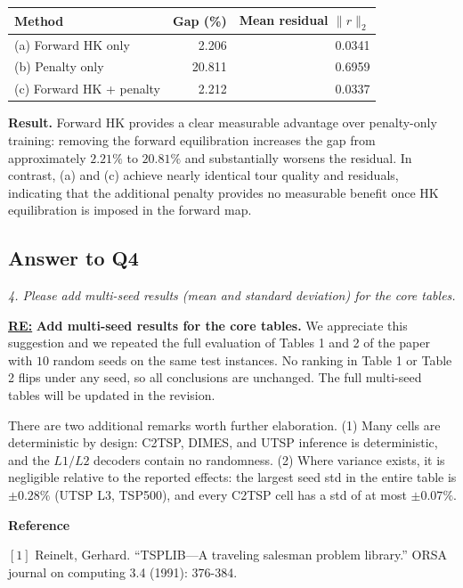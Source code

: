 \begin{table}[htbp]
    \centering
    \label{tab:hk_penalty_ablation}
    \begin{tabular}{lrr}
        \hline
        Method & Gap (\%) & Mean residual \(\lVert r\rVert_2\) \\
        \hline
        (a) Forward HK only & 2.206 & 0.0341 \\
        (b) Penalty only & 20.811 & 0.6959 \\
        (c) Forward HK + penalty & 2.212 & 0.0337 \\
        \hline
    \end{tabular}
\end{table}

\textbf{Result.} Forward HK provides a clear measurable advantage over penalty-only training: removing the forward equilibration increases the gap from approximately \(2.21\%\) to \(20.81\%\) and substantially worsens the residual. In contrast, (a) and (c) achieve nearly identical tour quality and residuals, indicating that the additional penalty provides no measurable benefit once HK equilibration is imposed in the forward map.


\subsection{Answer to Q4}

\textit{4. Please add multi-seed results (mean and standard deviation) for the core tables.}

\textbf{\underline{RE:}}
\textbf{Add multi-seed results for the core tables.} We appreciate this suggestion and we repeated the full evaluation of Tables 1 and 2 of the paper with $10$ random seeds on the same test instances. No ranking in Table 1 or Table 2 flips under any seed, so all conclusions are unchanged. The full multi-seed tables will be updated in the revision.

There are two additional remarks worth further elaboration. (1) Many cells are deterministic by design: C2TSP, DIMES, and UTSP inference is deterministic, and the $L1/L2$ decoders contain no randomness. (2) Where variance exists, it is negligible relative to the reported effects: the largest seed std in the entire table is $\pm 0.28\%$ (UTSP L3, TSP500), and every C2TSP cell has a std of at most $\pm 0.07\%$.


\textbf{Reference}

${[1]}$ Reinelt, Gerhard. ``TSPLIB—A traveling salesman problem library.'' ORSA journal on computing 3.4 (1991): 376-384.